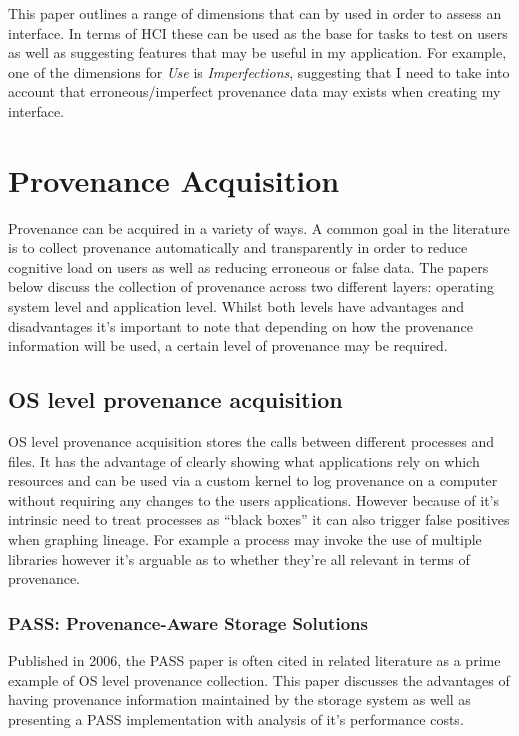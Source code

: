 This paper outlines a range of dimensions that can by used in order to assess an interface. In terms of HCI these can be used as the base for tasks to test on users as well as suggesting features that may be useful in my application. For example, one of the dimensions for \textit{Use} is \textit{Imperfections}, suggesting that I need to take into account that erroneous/imperfect provenance data may exists when creating my interface.

\section{Provenance Acquisition}
\label{sec:provenance_acquisition}

Provenance can be acquired in a variety of ways. A common goal in the literature is to collect provenance automatically and transparently in order to reduce cognitive load on users as well as reducing erroneous or false data. The papers below discuss the collection of provenance across two different layers: operating system level and application level. Whilst both levels have advantages and disadvantages it's important to note that depending on how the provenance information will be used, a certain level of provenance may be required.

\subsection{OS level provenance acquisition}
\label{sub:os_level_provenance_acquisition}

OS level provenance acquisition stores the calls between different processes and files. It has the advantage of clearly showing what applications rely on which resources and can be used via a custom kernel to log provenance on a computer without requiring any changes to the users applications.
However because of it's intrinsic need to treat processes as ``black boxes'' it can also trigger false positives when graphing lineage. For example a process may invoke the use of multiple libraries however it's arguable as to whether they're all relevant in terms of provenance.

\subsubsection{PASS: Provenance-Aware Storage Solutions\cite{Muniswamy2006}}
\label{ssub:PASS framework}

Published in 2006, the PASS paper is often cited in related literature as a prime example of OS level provenance collection. This paper discusses the advantages of having provenance information maintained by the storage system as well as presenting a PASS implementation with analysis of it's performance costs.

